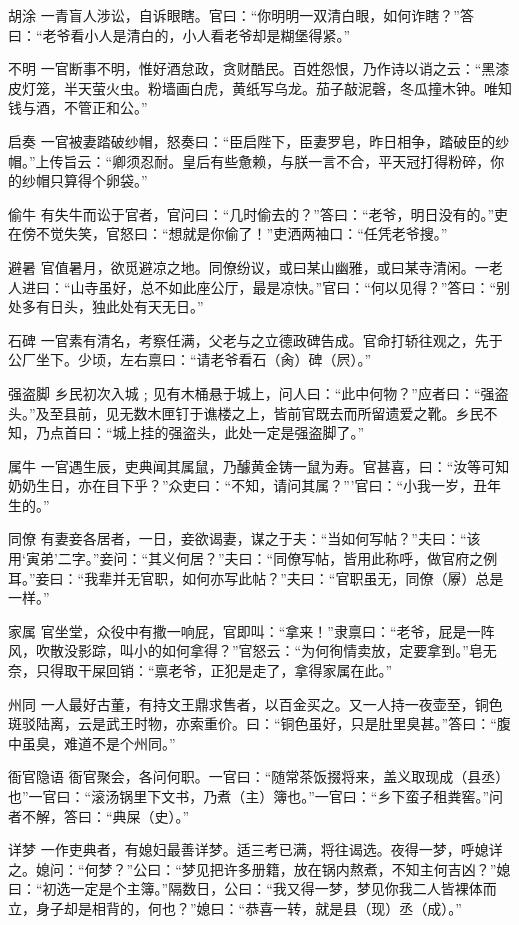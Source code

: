 \documentclass[12pt,UTF8]{ctexbook}
\begin{document}
胡涂
一青盲人涉讼，自诉眼瞎。官曰：“你明明一双清白眼，如何诈瞎？”答曰：“老爷看小人是清白的，小人看老爷却是糊堡得紧。”

不明
一官断事不明，惟好酒怠政，贪财酷民。百姓怨恨，乃作诗以诮之云：“黑漆皮灯笼，半天萤火虫。粉墙画白虎，黄纸写乌龙。茄子敲泥磬，冬瓜撞木钟。唯知钱与酒，不管正和公。”

启奏
一官被妻踏破纱帽，怒奏曰：“臣启陛下，臣妻罗皂，昨日相争，踏破臣的纱帽。”上传旨云：“卿须忍耐。皇后有些惫赖，与朕一言不合，平天冠打得粉碎，你的纱帽只算得个卵袋。”

偷牛
有失牛而讼于官者，官问曰：“几时偷去的？”答曰：“老爷，明日没有的。”吏在傍不觉失笑，官怒曰：“想就是你偷了！”吏洒两袖口：“任凭老爷搜。”

避暑
官值暑月，欲觅避凉之地。同僚纷议，或曰某山幽雅，或曰某寺清闲。一老人进曰：“山寺虽好，总不如此座公厅，最是凉快。”官曰：“何以见得？”答曰：“别处多有日头，独此处有天无日。”

石碑
一官素有清名，考察任满，父老与之立德政碑告成。官命打轿往观之，先于公厂坐下。少顷，左右禀曰：“请老爷看石（肏）碑（屄）。”

强盗脚
乡民初次入城﹔见有木桶悬于城上，问人曰：“此中何物？”应者曰：“强盗头。”及至县前，见无数木匣钉于谯楼之上，皆前官既去而所留遗爱之靴。乡民不知，乃点首曰：“城上挂的强盗头，此处一定是强盗脚了。”

属牛
一官遇生辰，吏典闻其属鼠，乃醵黄金铸一鼠为寿。官甚喜，曰：“汝等可知奶奶生日，亦在目下乎？”众吏曰：“不知，请问其属？”’官曰：“小我一岁，丑年生的。”

同僚
有妻妾各居者，一日，妾欲谒妻，谋之于夫：“当如何写帖？”夫曰：“该用‘寅弟’二字。”妾问：“其义何居？”夫曰：“同僚写帖，皆用此称呼，做官府之例耳。”妾曰：“我辈并无官职，如何亦写此帖？”夫曰：“官职虽无，同僚（屪）总是一样。”

家属
官坐堂，众役中有撒一响屁，官即叫：“拿来！”隶禀曰：“老爷，屁是一阵风，吹散没影踪，叫小的如何拿得？”官怒云：“为何徇情卖放，定要拿到。”皂无奈，只得取干屎回销：“禀老爷，正犯是走了，拿得家属在此。”

州同
一人最好古董，有持文王鼎求售者，以百金买之。又一人持一夜壶至，铜色斑驳陆离，云是武王时物，亦索重价。曰：“铜色虽好，只是肚里臭甚。”答曰：“腹中虽臭，难道不是个州同。”

衙官隐语
衙官聚会，各问何职。一官曰：“随常茶饭掇将来，盖义取现成（县丞）也”一官曰：“滚汤锅里下文书，乃煮（主）簿也。”一官曰：“乡下蛮子租粪窖。”问者不解，答曰：“典屎（史）。”

详梦
一作吏典者，有媳妇最善详梦。适三考已满，将往谒选。夜得一梦，呼媳详之。媳问：“何梦？”公曰：“梦见把许多册籍，放在锅内熬煮，不知主何吉凶？”媳曰：“初选一定是个主簿。”隔数日，公曰：“我又得一梦，梦见你我二人皆裸体而立，身子却是相背的，何也？”媳曰：“恭喜一转，就是县（现）丞（成）。”
\end{document}
